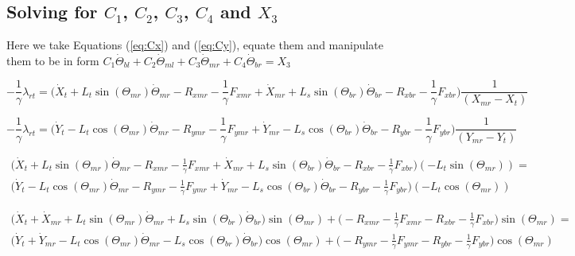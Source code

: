 \documentclass[11pt, landscape]{article}
\begin{document}
\subsection{Solving for $C_1$, $C_2$, $C_3$, $C_4$ and $X_3$}
Here we take Equations (\ref{eq:Cx}) and (\ref{eq:Cy}), equate them and manipulate them to be in form $ C_1\dot{\Theta}_{bl} + C_2 \dot{\Theta}_{ml} + C_3 \dot{\Theta}_{mr} + C_4 \dot{\Theta}_{br} = X_3$

\begin{equation}
-\frac{1}{\gamma}\lambda_{rt} = \Big( \dot{X}_{t } + L_{t}\sin(\Theta_{mr})\dot{\Theta}_{mr} - R_{xmr} - \frac{1}{\gamma}F_{xmr}
+ \dot{X}_{mr} + L_{s}\sin(\Theta_{br})\dot{\Theta}_{br} - R_{xbr} - \frac{1}{\gamma}F_{xbr}\Big) \frac{1}{(X_{mr} - X_{t })}
\end{equation}

\begin{equation}
-\frac{1}{\gamma}\lambda_{rt} = \Big( \dot{Y}_{t } - L_{t}\cos(\Theta_{mr})\dot{\Theta}_{mr} - R_{ymr} - \frac{1}{\gamma}F_{ymr}
+ \dot{Y}_{mr} - L_{s}\cos(\Theta_{br})\dot{\Theta}_{br} - R_{ybr} - \frac{1}{\gamma}F_{ybr}\Big) \frac{1}{(Y_{mr} - Y_{t })}
\end{equation}

\begin{multline}
\Big( \dot{X}_{t } + L_{t}\sin(\Theta_{mr})\dot{\Theta}_{mr} - R_{xmr} - \frac{1}{\gamma}F_{xmr}
+ \dot{X}_{mr} + L_{s}\sin(\Theta_{br})\dot{\Theta}_{br} - R_{xbr} - \frac{1}{\gamma}F_{xbr}\Big)(-L_{t}\sin(\Theta_{mr})) = \\
\Big( \dot{Y}_{t } - L_{t}\cos(\Theta_{mr})\dot{\Theta}_{mr} - R_{ymr} - \frac{1}{\gamma}F_{ymr}
+ \dot{Y}_{mr} - L_{s}\cos(\Theta_{br})\dot{\Theta}_{br} - R_{ybr} - \frac{1}{\gamma}F_{ybr}\Big)(-L_{t}\cos(\Theta_{mr}))
\end{multline}

\begin{multline}
\Big( \dot{X}_{t } + \dot{X}_{mr} + L_{t}\sin(\Theta_{mr})\dot{\Theta}_{mr} + L_{s}\sin(\Theta_{br})\dot{\Theta}_{br} \Big)\sin(\Theta_{mr}) +
\Big(- R_{xmr} - \frac{1}{\gamma}F_{xmr} - R_{xbr} - \frac{1}{\gamma}F_{xbr}\Big)\sin(\Theta_{mr}) = \\
\Big(\dot{Y}_{t } + \dot{Y}_{mr} - L_{t}\cos(\Theta_{mr})\dot{\Theta}_{mr} - L_{s}\cos(\Theta_{br})\dot{\Theta}_{br}\Big)\cos(\Theta_{mr}) +
\Big(- R_{ymr} - \frac{1}{\gamma}F_{ymr} - R_{ybr} - \frac{1}{\gamma}F_{ybr}\Big)\cos(\Theta_{mr})
\end{multline}
\end{document}
